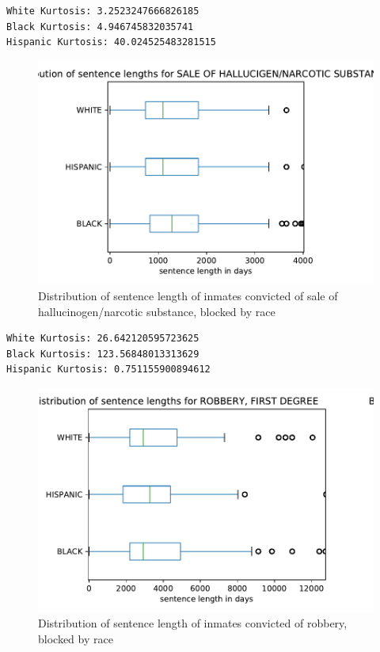 \documentclass[11pt]{article}
\begin{document}
    \begin{Verbatim}[commandchars=\\\{\}]
White Kurtosis: 3.2523247666826185
Black Kurtosis: 4.946745832035741
Hispanic Kurtosis: 40.024525483281515

    \end{Verbatim}

\begin{figure}[H]
    \centering
    \includegraphics[scale=.6]{images/SALE OF HA_box.pdf}
    \caption{Distribution of sentence length of inmates convicted of sale of hallucinogen/narcotic substance, blocked by race}
    \label{fig:my_label}
\end{figure}
    
    \begin{Verbatim}[commandchars=\\\{\}]
White Kurtosis: 26.642120595723625
Black Kurtosis: 123.56848013313629
Hispanic Kurtosis: 0.751155900894612

    \end{Verbatim}

\begin{figure}[H]
    \centering
    \includegraphics[scale=.6]{images/ROBBERY, F_box.pdf}
    \caption{Distribution of sentence length of inmates convicted of robbery, blocked by race}
    \label{fig:my_label}
\end{figure}
    
\end{document}

